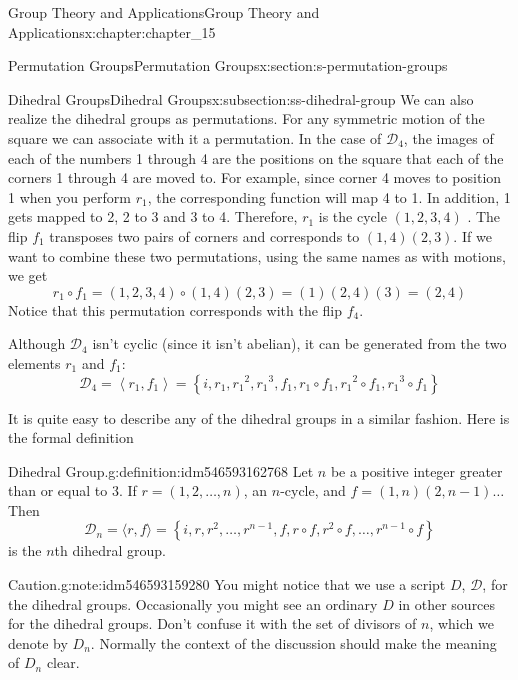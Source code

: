 \documentclass[oneside,10pt,]{book}
\numberwithin{equation}{section}
\begin{document}
\begin{chapterptx}{Group Theory and Applications}{}{Group Theory and Applications}{}{}{x:chapter:chapter_15}
\begin{sectionptx}{Permutation Groups}{}{Permutation Groups}{}{}{x:section:s-permutation-groups}
\begin{subsectionptx}{Dihedral Groups}{}{Dihedral Groups}{}{}{x:subsection:ss-dihedral-group}
We can also realize the dihedral groups as permutations.  For any symmetric motion of the square we can associate with it a permutation.  In the case of \(\mathcal{D}_4\), the images of each of the numbers 1 through 4 are the positions on the square that each of the corners 1 through 4 are moved to.  For example, since corner 4 moves to position 1 when you perform \(r_1\),  the corresponding function will map 4 to 1.   In addition, 1 gets mapped to 2, 2 to 3 and 3 to 4.  Therefore, \(r_1\) is the cycle \((1,2,3,4)\) .   The flip \(f_1\) transposes two pairs of corners and corresponds to \((1,4)(2,3)\).  If we want to combine these two permutations, using the same names as with motions, we get%
\begin{equation*}
r_1\circ f_1= (1,2,3,4)\circ (1,4)(2,3)=(1)(2,4)(3) = (2,4)
\end{equation*}
Notice that this permutation corresponds with the flip \(f_4\).%
\par
Although \(\mathcal{D}_4\) isn't cyclic (since it isn't abelian), it can be generated from the two elements \(r_1\) and \(f_1\):%
\begin{equation*}
\mathcal{D}_4= \left\langle r_1,f_1\right\rangle = \left\{i, r_1, r_1{}^2, r_1{}^3, f_1, r_1\circ f_1, r_1{}^2\circ f_1, r_1{}^3\circ f_1\right\}
\end{equation*}
%
\par
It is quite easy to describe any of the dihedral groups in a similar fashion.  Here is the formal definition%
\begin{definition}{Dihedral Group.}{g:definition:idm546593162768}%
%
\label{g:notation:idm546593160656}%
Let \(n\) be a positive integer greater than or equal to 3. If \(r= (1,2, \ldots , n)\),    an \(n\)-cycle,   and \(f= (1,n)(2,n-1)\ldots\) Then%
\begin{equation*}
\mathcal{D}_n= \langle r,f\rangle  = \left\{i, r, r^2, \ldots, r^{n-1}, f, r\circ f, r^2\circ f, \ldots, r^{n-1}\circ f\right\}
\end{equation*}
is the \(n\)th dihedral group.%
\end{definition}
\begin{note}{Caution.}{g:note:idm546593159280}%
You might notice that we use a script \(D\), \(\mathcal{D}\), for the dihedral groups.  Occasionally you might see an ordinary \(D\) in other sources for the dihedral groups.  Don't  confuse it with the set of divisors of \(n\), which we denote by \(D_n\).  Normally the context of the discussion should make the meaning of \(D_n\) clear.%

\end{note}
\end{subsectionptx}
\end{sectionptx}
\end{chapterptx}
\end{document}
